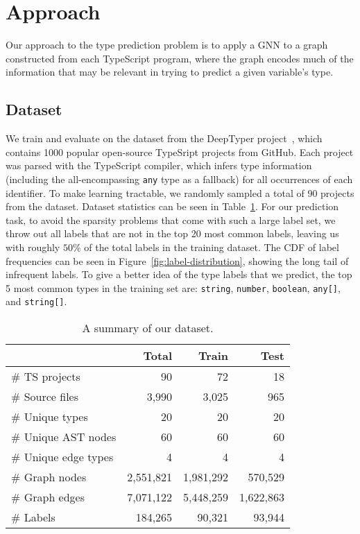 \section{Approach}
\label{sec:approach}

Our approach to the type prediction problem is to apply a GNN to a graph constructed from each TypeScript program, where the graph encodes much of the information that may be relevant in trying to predict a given variable's type.

\subsection{Dataset}
\label{sec:dataset}
We train and evaluate on the dataset from the DeepTyper project~\cite{hellendoorn2018deep}, which contains 1000 popular open-source TypeSript projects from GitHub.
Each project was parsed with the TypeScript compiler, which infers type information (including the all-encompassing \texttt{any} type as a fallback) for all occurrences of each identifier.
To make learning tractable, we randomly sampled a total of 90 projects from the dataset.
Dataset statistics can be seen in Table~\ref{tab:dataset}.
For our prediction task, to avoid the sparsity problems that come with such a large label set, we throw out all labels that are not in the top 20 most common labels, leaving us with roughly $50\%$ of the total labels in the training dataset.
The CDF of label frequencies can be seen in Figure~\ref{fig:label-distribution}, showing the long tail of infrequent labels.
To give a better idea of the type labels that we predict, the top 5 most common types in the training set are: \texttt{string}, \texttt{number}, \texttt{boolean}, \texttt{any[]}, and \texttt{string[]}.

\begin{table}
  \centering
  {\renewcommand{\arraystretch}{1.15}%
    \begin{tabular}{l|rrr}
      \textbf{~} & \textbf{Total} & \textbf{Train} & \textbf{Test} \\
      \hline
      \# TS projects & 90 & 72 & 18 \\
      \# Source files & 3,990 & 3,025 & 965 \\
      \# Unique types & 20 & 20 & 20 \\
      \# Unique AST nodes & 60 & 60 & 60 \\
      \# Unique edge types & 4 & 4 & 4 \\
      \# Graph nodes & 2,551,821 & 1,981,292 & 570,529 \\
      \# Graph edges & 7,071,122 & 5,448,259 & 1,622,863 \\
      \# Labels  & 184,265 & 90,321 & 93,944 \\
    \end{tabular}
  }
  \caption{A summary of our dataset.}
  \label{tab:dataset}
\end{table}

